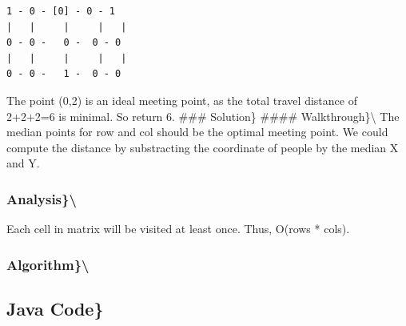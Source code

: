 \documentclass[]{book}
\begin{document}
\begin{verbatim}
1 - 0 - [0] - 0 - 1
|   |     |     |   |
0 - 0 -   0 -  0 - 0
|   |     |     |   |
0 - 0 -   1 -  0 - 0
\end{verbatim}

The point (0,2) is an ideal meeting point, as the total travel distance of 2+2+2=6 is minimal. So return 6.
\#\#\# Solution\}
\#\#\#\# Walkthrough\}\textbackslash{}
The median points for row and col should be the optimal meeting point. We could compute the distance by substracting
the coordinate of people by the median X and Y.

\hypertarget{analysis-56}{%
\subsubsection{Analysis\}\textbackslash{}}\label{analysis-56}}

Each cell in matrix will be visited at least once. Thus, O(rows * cols).

\hypertarget{algorithm-55}{%
\subsubsection{Algorithm\}\textbackslash{}}\label{algorithm-55}}

\hypertarget{java-code-40}{%
\subsection{Java Code\}}\label{java-code-40}}
\end{document}
